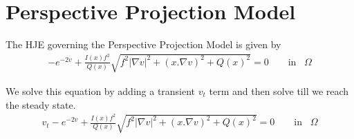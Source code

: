 \section{Perspective Projection Model}
The HJE\cite{prados2} governing the Perspective Projection Model is given by
\begin{eqnarray}
	-e^{-2v} + \frac{I(x)f^2}{Q(x)} \sqrt{f^2|\nabla v|^2 + (x.\nabla
		v)^2 + Q(x)^2} = 0 \qquad \text{in} \;\;\; \Omega
\end{eqnarray}

\noindent
We solve this equation by adding a transient $v_t$ term and then solve till we reach the steady state.
\begin{eqnarray}
v_t -e^{-2v} + \frac{I(x)f^2}{Q(x)} \sqrt{f^2|\nabla v|^2 + (x.\nabla
	v)^2 + Q(x)^2} = 0 \qquad \text{in} \;\;\; \Omega
\end{eqnarray} 

